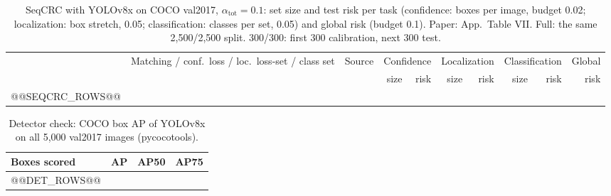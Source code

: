 \begin{table}[h]
\centering\footnotesize
\setlength{\tabcolsep}{3.2pt}
\caption{SeqCRC with YOLOv8x on COCO val2017, $\alpha_{\text{tot}}=0.1$: set size and test risk per task (confidence:
boxes per image, budget 0.02; localization: box stretch, 0.05; classification: classes per set, 0.05) and global risk
(budget 0.1). Paper: App.\ Table VII. Full: the same 2{,}500/2{,}500 split. 300/300: first 300 calibration, next 300 test.}
\label{tab:seqcrc}
\begin{tabular}{@{}l p{3.3cm} l rr rr rr r@{}}
\toprule
 & Matching / conf.\ loss / loc.\ loss-set / class set & Source & \multicolumn{2}{c}{Confidence} & \multicolumn{2}{c}{Localization} & \multicolumn{2}{c}{Classification} & Global \\
\cmidrule(lr){4-5}\cmidrule(lr){6-7}\cmidrule(lr){8-9}
 & & & size & risk & size & risk & size & risk & risk \\
\midrule
@@SEQCRC_ROWS@@
\bottomrule
\end{tabular}
\end{table}

\begin{table}[h]
\centering\footnotesize
\caption{Detector check: COCO box AP of YOLOv8x on all 5{,}000 val2017 images (pycocotools).}
\label{tab:det}
\begin{tabular}{@{}lrrr@{}}
\toprule
Boxes scored & AP & AP50 & AP75 \\
\midrule
@@DET_ROWS@@
\bottomrule
\end{tabular}
\end{table}


